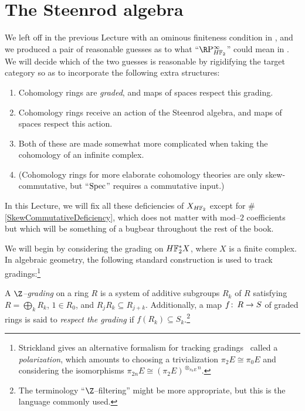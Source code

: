\section{The Steenrod algebra}\label{TheSteenrodAlgebraSection}

We left off in the previous Lecture with an ominous finiteness condition in , and we produced a pair of reasonable guesses as to what ``$\RP^\infty_{\HFtwo}$'' could mean in .  We will decide which of the two guesses is reasonable by rigidifying the target category so as to incorporate the following extra structures:
\begin{enumerate}
\item Cohomology rings are \emph{graded}, and maps of spaces respect this grading.
\item Cohomology rings receive an action of the Steenrod algebra, and maps of spaces respect this action.
\item Both of these are made somewhat more complicated when taking the cohomology of an infinite complex.
\item \label{SkewCommutativeDeficiency} (Cohomology rings for more elaborate cohomology theories are only skew-commutative, but ``$\operatorname{Spec}$'' requires a commutative input.)
\end{enumerate}
In this Lecture, we will fix all these deficiencies of $X_{\HFtwo}$ except for \#\ref{SkewCommutativeDeficiency}, which does not matter with mod--$2$ coefficients but which will be something of a bugbear throughout the rest of the book.

We will begin by considering the grading on $\HFtwo^* X$, where $X$ is a finite complex.  In algebraic geometry, the following standard construction is used to track gradings:\footnote{Strickland gives an alternative formalism for tracking gradings~\cite[Sections 11 and 14]{StricklandFPFP} called a \emph{polarization}, which amounts to choosing a trivialization $\pi_2 E \cong \pi_0 E$ and considering the isomorphisms $\pi_{2n} E \cong (\pi_2 E)^{\otimes_{\pi_0 E} n}$.}

\begin{definition}
A \textit{$\Z$--grading} on a ring $R$ is a system of additive subgroups $R_k$ of $R$ satisfying $R = \bigoplus_k R_k$, $1 \in R_0$, and $R_j R_k \subseteq R_{j+k}$.  Additionally, a map $f\colon\thinspace R \to S$ of graded rings is said to \textit{respect the grading} if $f(R_k) \subseteq S_k$.\footnote{The terminology ``$\Z$--filtering'' might be more appropriate, but this is the language commonly used.}
\end{definition}


